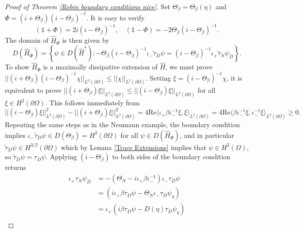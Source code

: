 \documentclass{article}
\numberwithin{equation}{section}
\begin{document}
    \begin{proof}[Proof of Theorem \ref{Robin boundary conditions nice}]
        Set $\Theta_\beta=\Theta_\beta(\eta)$ and $\Phi=(i + \Theta_\beta)(i- \Theta_\beta)^{-1}$. It is easy to verify
    \begin{equation}
        (\mathds{1}+\Phi)=2i (i-\Theta_\beta)^{-1}, \quad (\mathds{1}-\Phi)=-2\Theta_\beta (i-\Theta_\beta)^{-1}.
    \end{equation}
    The domain of $\hat{H}_\Phi$ is then given by
    \begin{equation}
        D(\hat{H}_\Phi)= \left\{\psi \in D(\hat{H}^*): -\Theta_\beta (i- \Theta_\beta)^{-1}\iota_-\tilde{\tau}_D \psi=(i - \Theta_\beta)^{-1}\iota_+ \tilde{\tau}_N \psi_D \right\}.
    \end{equation}
    To show $\hat{H}_\Phi$ is a maximally dissipative extension of $\hat{H}$, we must prove $||(i+\Theta_\beta)(i-\Theta_\beta)^{-1}\chi||_{L^2(\partial \Omega)}\leq ||\chi||_{L^2(\partial \Omega)}$. Setting $\xi=(i-\Theta_\beta)^{-1}\chi$, it is equivalent to prove $||(i+\Theta_\beta)\xi||_{L^2(\partial \Omega)}\leq ||(i-\Theta_\beta)\xi||_{L^2(\partial \Omega)}$ for all $\xi \in H^{2}(\partial \Omega)$. This follows immediately from
    \begin{equation}\label{contraction regular}
        ||(i-\Theta_\beta)\xi||_{L^2(\partial \Omega)}^2-||(i+\Theta_\beta)\xi||_{L^2(\partial \Omega)}^2=4\text{Re}\langle \iota_+\beta\iota_-^{-1}\xi,\xi\rangle_{L^2(\partial \Omega)}=4\text{Re}\langle \beta\iota_-^{-1}\xi, \iota_-^{-1}\xi\rangle_{L^2(\partial \Omega)}\geq 0.
    \end{equation}
    Repeating the same steps as in the Neumann example, the boundary condition implies $\iota_- \tilde{\tau}_D \psi \in D(\Theta_\beta)=H^2(\partial \Omega)$ for all $\psi \in D(\hat{H}_\Phi)$, and in particular $\tilde{\tau}_D \psi \in H^{3/2}(\partial \Omega)$ which by Lemma \ref{Trace Extensions} implies that $\psi \in H^2(\Omega)$, so $\tilde{\tau}_D \psi= \tau_D \psi$.  Applying $(i- \Theta_\beta)$ to both sides of the boundary condition returns
    \begin{equation}
    \begin{split}
         \iota_+ \tau_N \psi_D&= - (\Theta_N- i\iota_+ \beta \iota_-^{-1}) \iota_- \tau_D \psi
        \\
        &= (i\iota_+ \beta \tau_D \psi-\Theta_N\iota_- \tau_D \psi_\eta) 
        \\
        &=\iota_+( i \beta \tau_D \psi-D(\eta) \tau_D \psi_\eta) 
        \\

\end{split}
\end{equation}
\end{proof}
\end{document}
